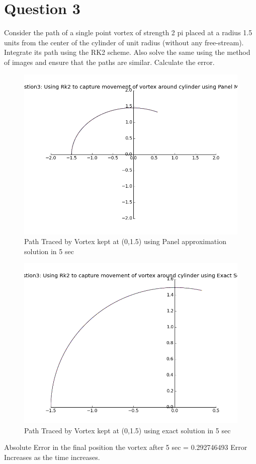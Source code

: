 \documentclass{article}
\begin{document}
\section*{Question 3}
Consider the path of a single point vortex of strength 2 pi placed at a radius 1.5 units from the center of the cylinder of unit radius (without any free-stream). Integrate its path using the RK2 scheme. Also solve the same using the method of images and ensure that the paths are similar. Calculate the error.
\begin{figure}[H] \label{figure}
\includegraphics[width=12cm]{q3_panel.png}
\caption{Path Traced by Vortex kept at (0,1.5) using Panel approximation solution in 5 sec}
\label{figure:}
\end{figure}

\begin{figure}[H]  \label{figure}
\includegraphics[width=12cm]{q3_exact.png}
\caption{Path Traced by Vortex kept at (0,1.5) using exact solution in 5 sec}
\label{figure:}
\end{figure}

Absolute Error in the final position the vortex after 5 sec = 0.292746493
Error Increases as the time increases.
 
  
\end{document}
